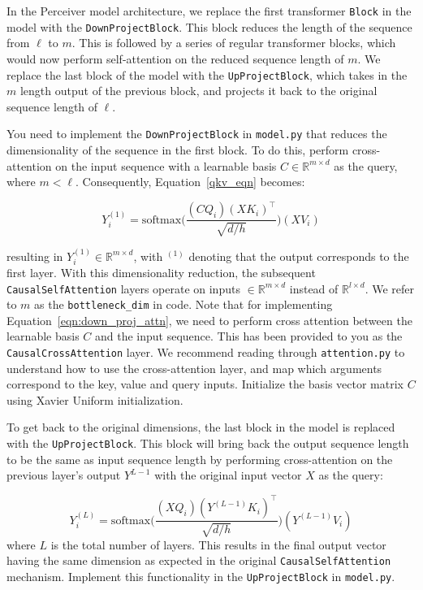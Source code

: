 \begin{parts}
In the Perceiver model architecture, we replace the first transformer \texttt{Block} in the model with the \texttt{DownProjectBlock}. This block reduces the length of the sequence from $\ell$ to $m$. This is followed by a series of regular transformer blocks, which would now perform self-attention on the reduced sequence length of $m$. We replace the last block of the model with the \texttt{UpProjectBlock}, which takes in the $m$ length output of the previous block, and projects it back to the original sequence length of $\ell$.

You need to implement the \texttt{DownProjectBlock} in \texttt{model.py} that reduces the dimensionality of the sequence in the first block. To do this, perform cross-attention on the input sequence with a learnable basis $C \in \mathbb{R}^{m \times d}$ as the query, where $m < \ell$. Consequently, Equation~\ref{qkv_eqn} becomes: 

\begin{equation}\label{eqn:down_proj_attn}
Y_i^{(1)} = \text{softmax}\bigg(\frac{(CQ_i)(XK_i)^\top}{\sqrt{d/h}}\bigg)(XV_i)    
\end{equation}

resulting in $Y_i^{(1)} \in\mathbb{R}^{m\times d}$, with $^{(1)}$ denoting that the output corresponds to the first layer. With this dimensionality reduction, the subsequent \texttt{CausalSelfAttention} layers operate on inputs $\in \mathbb{R}^{m\times d}$ instead of $\mathbb{R}^{l\times d}$. We refer to $m$ as the \texttt{bottleneck\_dim} in code. Note that for implementing Equation~\ref{eqn:down_proj_attn}, we need to perform cross attention between the learnable basis $C$ and the input sequence. This has been provided to you as the \texttt{CausalCrossAttention} layer. We recommend reading through \texttt{attention.py} to understand how to use the cross-attention layer, and map which arguments correspond to the key, value and query inputs. Initialize the basis vector matrix $C$ using Xavier Uniform initialization.

To get back to the original dimensions, the last block in the model is replaced with the \texttt{UpProjectBlock}. This block will bring back the output sequence length to be the same as input sequence length  by performing cross-attention on the previous layer's output $Y^{L-1}$ with the original input vector $X$ as the query:

\begin{equation}\label{eqn:up_proj_attn}
Y_i^{(L)} = \text{softmax}\bigg(\frac{(XQ_i)(Y^{(L-1)}K_i)^\top}{\sqrt{d/h}}\bigg)(Y^{(L-1)}V_i)
\end{equation}
where $L$ is the total number of layers. This results in the final output vector having the same dimension as expected in the original \texttt{CausalSelfAttention} mechanism. Implement this functionality in the \texttt{UpProjectBlock} in \texttt{model.py}.




\end{parts}

